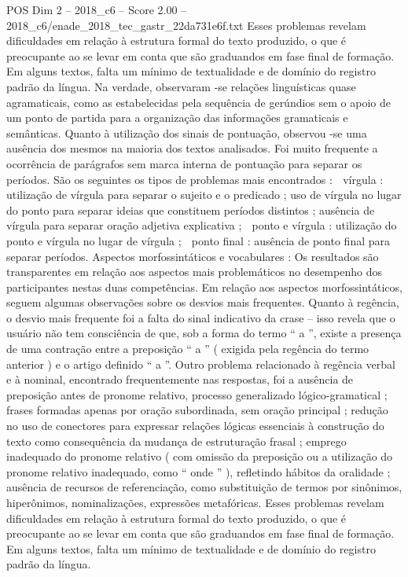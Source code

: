 \begin{textsample}{POS Dim 2 – 2018\_c6 – Score 2.00 – 2018\_c6/enade\_2018\_tec\_gastr\_22da731e6f.txt}
Esses problemas revelam dificuldades em relação à estrutura formal do texto produzido, o que é preocupante ao se levar em conta que são graduandos em fase final de formação.
Em alguns textos, falta um mínimo de textualidade e de domínio do registro padrão da língua.
Na verdade, observaram -se relações linguísticas quase agramaticais, como as estabelecidas pela sequência de gerúndios sem o apoio de um ponto de partida para a organização das informações gramaticais e semânticas.
Quanto à utilização dos sinais de pontuação, observou -se uma ausência dos mesmos na maioria dos textos analisados.
Foi muito frequente a ocorrência de parágrafos sem marca interna de pontuação para separar os períodos.
São os seguintes os tipos de problemas mais encontrados :  vírgula : utilização de vírgula para separar o sujeito e o predicado ; uso de vírgula no lugar do ponto para separar ideias que constituem períodos distintos ; ausência de vírgula para separar oração adjetiva explicativa ;  ponto e vírgula : utilização do ponto e vírgula no lugar de vírgula ;  ponto final : ausência de ponto final para separar períodos.
Aspectos morfossintáticos e vocabulares : Os resultados são transparentes em relação aos aspectos mais problemáticos no desempenho dos participantes nestas duas competências.
Em relação aos aspectos morfossintáticos, seguem algumas observações sobre os desvios mais frequentes.
Quanto à regência, o desvio mais frequente foi a falta do sinal indicativo da crase – isso revela que o usuário não tem consciência de que, sob a forma do termo “ a ”, existe a presença de uma contração entre a preposição “ a ” ( exigida pela regência do termo anterior ) e o artigo definido “ a ”.
Outro problema relacionado à regência verbal e à nominal, encontrado frequentemente nas respostas, foi a ausência de preposição antes de pronome relativo, processo generalizado lógico-gramatical ; frases formadas apenas por oração subordinada, sem oração principal ; redução no uso de conectores para expressar relações lógicas essenciais à construção do texto como consequência da mudança de estruturação frasal ; emprego inadequado do pronome relativo ( com omissão da preposição ou a utilização do pronome relativo inadequado, como “ onde ” ), refletindo hábitos da oralidade ; ausência de recursos de referenciação, como substituição de termos por sinônimos, hiperônimos, nominalizações, expressões metafóricas.
Esses problemas revelam dificuldades em relação à estrutura formal do texto produzido, o que é preocupante ao se levar em conta que são graduandos em fase final de formação.
Em alguns textos, falta um mínimo de textualidade e de domínio do registro padrão da língua.

\end{textsample}
